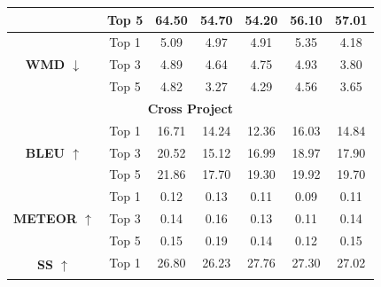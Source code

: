 \begin{table}[!ht]
{\begin{tabular}{|ccccccc|}
\multicolumn{1}{|c|}{} & \multicolumn{1}{c|}{Top 5} & \multicolumn{1}{c|}{64.50} & \multicolumn{1}{c|}{54.70} & \multicolumn{1}{c|}{54.20} & \multicolumn{1}{c|}{56.10} & 57.01 \\ \hline
\multicolumn{1}{|c|}{\multirow{3}{*}{\textbf{WMD $\downarrow$}}} & \multicolumn{1}{c|}{Top 1} & \multicolumn{1}{c|}{5.09} & \multicolumn{1}{c|}{4.97} & \multicolumn{1}{c|}{4.91} & \multicolumn{1}{c|}{5.35} & 4.18 \\ \cline{2-7} 
\multicolumn{1}{|c|}{} & \multicolumn{1}{c|}{Top 3} & \multicolumn{1}{c|}{4.89} & \multicolumn{1}{c|}{4.64} & \multicolumn{1}{c|}{4.75} & \multicolumn{1}{c|}{4.93} & 3.80 \\ \cline{2-7} 
\multicolumn{1}{|c|}{} & \multicolumn{1}{c|}{Top 5} & \multicolumn{1}{c|}{4.82} & \multicolumn{1}{c|}{3.27} & \multicolumn{1}{c|}{4.29} & \multicolumn{1}{c|}{4.56} & 3.65 \\ \hline \hline
\multicolumn{7}{|c|}{\textbf{Cross Project}} \\ \hline  \hline
\multicolumn{1}{|c|}{\multirow{3}{*}{\textbf{BLEU $\uparrow$}}} & \multicolumn{1}{c|}{Top 1} & \multicolumn{1}{c|}{16.71} & \multicolumn{1}{c|}{14.24} & \multicolumn{1}{c|}{12.36} & \multicolumn{1}{c|}{16.03} & 14.84 \\ \cline{2-7} 
\multicolumn{1}{|c|}{} & \multicolumn{1}{c|}{Top 3} & \multicolumn{1}{c|}{20.52} & \multicolumn{1}{c|}{15.12} & \multicolumn{1}{c|}{16.99} & \multicolumn{1}{c|}{18.97} & 17.90 \\ \cline{2-7} 
\multicolumn{1}{|c|}{} & \multicolumn{1}{c|}{Top 5} & \multicolumn{1}{c|}{21.86} & \multicolumn{1}{c|}{17.70} & \multicolumn{1}{c|}{19.30} & \multicolumn{1}{c|}{19.92} & 19.70 \\ \hline
\multicolumn{1}{|c|}{\multirow{3}{*}{\textbf{METEOR $\uparrow$}}} & \multicolumn{1}{c|}{Top 1} & \multicolumn{1}{c|}{0.12} & \multicolumn{1}{c|}{0.13} & \multicolumn{1}{c|}{0.11} & \multicolumn{1}{c|}{0.09} & 0.11 \\ \cline{2-7} 
\multicolumn{1}{|c|}{} & \multicolumn{1}{c|}{Top 3} & \multicolumn{1}{c|}{0.14} & \multicolumn{1}{c|}{0.16} & \multicolumn{1}{c|}{0.13} & \multicolumn{1}{c|}{0.11} & 0.14 \\ \cline{2-7} 
\multicolumn{1}{|c|}{} & \multicolumn{1}{c|}{Top 5} & \multicolumn{1}{c|}{0.15} & \multicolumn{1}{c|}{0.19} & \multicolumn{1}{c|}{0.14} & \multicolumn{1}{c|}{0.12} & 0.15 \\ \hline
\multicolumn{1}{|c|}{\multirow{3}{*}{\textbf{SS $\uparrow$}}} & \multicolumn{1}{c|}{Top 1} & \multicolumn{1}{c|}{26.80} & \multicolumn{1}{c|}{26.23} & \multicolumn{1}{c|}{27.76} & \multicolumn{1}{c|}{27.30} & 27.02 \\ \cline{2-7} 

\end{tabular}}
\end{table}
